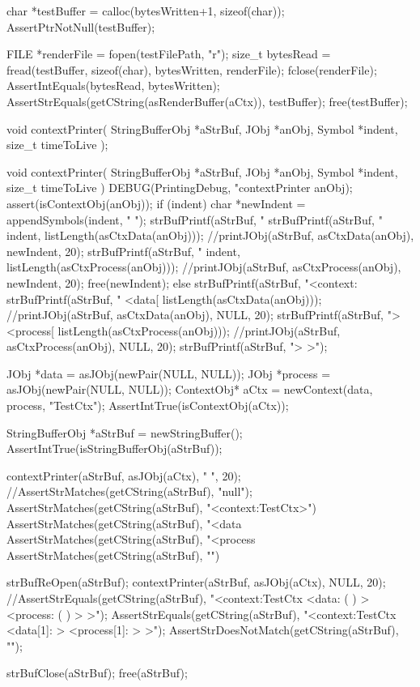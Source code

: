   char *testBuffer = calloc(bytesWritten+1, sizeof(char));
  AssertPtrNotNull(testBuffer);
  
  FILE *renderFile = fopen(testFilePath, "r");
  size_t bytesRead = fread(testBuffer, sizeof(char), bytesWritten, renderFile);
  fclose(renderFile);
  AssertIntEquals(bytesRead, bytesWritten);
  AssertStrEquals(getCString(asRenderBuffer(aCtx)), testBuffer);
  free(testBuffer);
\stopCTest
\stopTestCase
\stopTestSuite

\startTestSuite[contextPrinter]

\startCHeader
void contextPrinter(
  StringBufferObj *aStrBuf,
  JObj            *anObj,
  Symbol          *indent,
  size_t           timeToLive
);
\stopCHeader

\startCCode
void contextPrinter(
  StringBufferObj *aStrBuf,
  JObj            *anObj,
  Symbol          *indent,
  size_t           timeToLive
) {
  DEBUG(PrintingDebug, "contextPrinter %
  anObj);
  assert(isContextObj(anObj));
  if (indent) {
    char *newIndent = appendSymbols(indent, "    ");
    strBufPrintf(aStrBuf, "%
    strBufPrintf(aStrBuf, "%
      indent, listLength(asCtxData(anObj)));
    //printJObj(aStrBuf, asCtxData(anObj), newIndent, 20);
    strBufPrintf(aStrBuf, "%
      indent, listLength(asCtxProcess(anObj)));
    //printJObj(aStrBuf, asCtxProcess(anObj), newIndent, 20);
    free(newIndent);
  } else {
    strBufPrintf(aStrBuf, "<context:%
    strBufPrintf(aStrBuf, "  <data[%
      listLength(asCtxData(anObj)));
    //printJObj(aStrBuf, asCtxData(anObj), NULL, 20);
    strBufPrintf(aStrBuf, "> <process[%
      listLength(asCtxProcess(anObj)));
    //printJObj(aStrBuf, asCtxProcess(anObj), NULL, 20);
    strBufPrintf(aStrBuf, "> >");
  }
}
\stopCCode


\startCTest
  JObj *data       = asJObj(newPair(NULL, NULL));
  JObj *process    = asJObj(newPair(NULL, NULL));
  ContextObj* aCtx = newContext(data, process, "TestCtx");
  AssertIntTrue(isContextObj(aCtx));
  
  StringBufferObj *aStrBuf = newStringBuffer();
  AssertIntTrue(isStringBufferObj(aStrBuf));
  
  contextPrinter(aStrBuf, asJObj(aCtx), "  ", 20);
  //AssertStrMatches(getCString(aStrBuf), "null");
  AssertStrMatches(getCString(aStrBuf), "<context:TestCtx>")
  AssertStrMatches(getCString(aStrBuf), "<data%
  AssertStrMatches(getCString(aStrBuf), "<process%
  AssertStrMatches(getCString(aStrBuf), "\n")

  strBufReOpen(aStrBuf);
  contextPrinter(aStrBuf, asJObj(aCtx), NULL, 20);
  //AssertStrEquals(getCString(aStrBuf), "<context:TestCtx   <data: (  )  > <process: (  )  > >");
  AssertStrEquals(getCString(aStrBuf), "<context:TestCtx   <data[1]: > <process[1]: > >");
  AssertStrDoesNotMatch(getCString(aStrBuf), "\n");
  
  strBufClose(aStrBuf);
  free(aStrBuf);
\stopCTest
\stopTestCase
\stopTestSuite